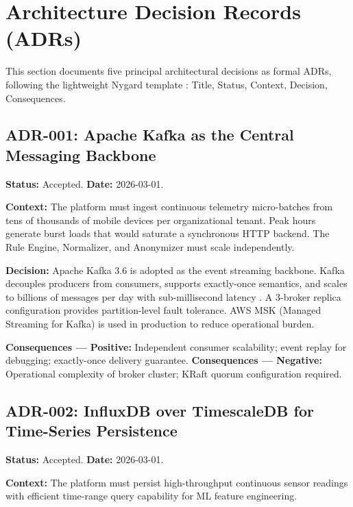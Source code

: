 \documentclass[conference]{IEEEtran}
\begin{document}
\section{Architecture Decision Records (ADRs)}

This section documents five principal architectural decisions as formal ADRs, following
the lightweight Nygard template \cite{b27}: Title, Status, Context, Decision, Consequences.

\subsection{ADR-001: Apache Kafka as the Central Messaging Backbone}

\textbf{Status:} Accepted. \quad \textbf{Date:} 2026-03-01.

\textbf{Context:} The platform must ingest continuous telemetry micro-batches from
tens of thousands of mobile devices per organizational tenant. Peak hours generate
burst loads that would saturate a synchronous HTTP backend. The Rule Engine, Normalizer,
and Anonymizer must scale independently.

\textbf{Decision:} Apache Kafka 3.6 is adopted as the event streaming backbone.
Kafka decouples producers from consumers, supports exactly-once semantics, and scales
to billions of messages per day with sub-millisecond latency \cite{b10}. A 3-broker
replica configuration provides partition-level fault tolerance. AWS MSK (Managed
Streaming for Kafka) is used in production to reduce operational burden.

\textbf{Consequences — Positive:} Independent consumer scalability; event replay
for debugging; exactly-once delivery guarantee.
\textbf{Consequences — Negative:} Operational complexity of broker cluster;
KRaft quorum configuration required.

\subsection{ADR-002: InfluxDB over TimescaleDB for Time-Series Persistence}

\textbf{Status:} Accepted. \quad \textbf{Date:} 2026-03-01.

\textbf{Context:} The platform must persist high-throughput continuous sensor readings
with efficient time-range query capability for ML feature engineering.
\end{document}
